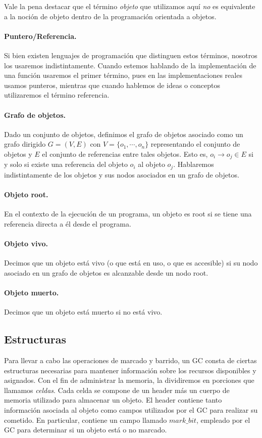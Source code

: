 Vale la pena destacar que el término \textit{objeto} que utilizamos aquí \emph{no} es equivalente a la noción de objeto dentro de la programación orientada a objetos.

\paragraph*{Puntero/Referencia.} Si bien existen lenguajes de programación que distinguen estos términos, nosotros los usaremos indistintamente. Cuando estemos hablando de la implementación de una función usaremos el primer término, pues en las implementaciones reales usamos punteros, mientras que cuando hablemos de ideas o conceptos utilizaremos el término referencia.

\paragraph*{Grafo de objetos.} Dado un conjunto de objetos, definimos el grafo de objetos asociado como un grafo dirigido $G = (V, E)$ con $V = \{o_1, \cdots, o_n\}$ representando el conjunto de objetos y $E$ el conjunto de referencias entre tales objetos. Esto es, $o_i \to o_j \in E$ si y solo si existe una referencia del objeto $o_i$ al objeto $o_j$. Hablaremos indistintamente de los objetos y sus nodos asociados en un grafo de objetos.

\paragraph*{Objeto root.} En el contexto de la ejecución de un programa, un objeto es root si se tiene una referencia directa a él desde el programa.

\paragraph*{Objeto vivo.} Decimos que un objeto está vivo (o que está en uso, o que es accesible) si su nodo asociado en un grafo de objetos es alcanzable desde un nodo root.

\paragraph*{Objeto muerto.} Decimos que un objeto está muerto si no está vivo.\\[0.75cm]

\subsection{Estructuras}
Para llevar a cabo las operaciones de marcado y barrido, un GC consta de ciertas estructuras necesarias para mantener información sobre los recursos disponibles y asignados. Con el fin de administrar la memoria, la dividiremos en porciones que llamamos \textit{celdas}. Cada celda se compone de un header más un cuerpo de memoria utilizado para almacenar un objeto. El header contiene tanto información asociada al objeto como campos utilizados por el GC para realizar su cometido. En particular, contiene un campo llamado $mark\_bit$, empleado por el GC para determinar si un objeto está o no marcado.

